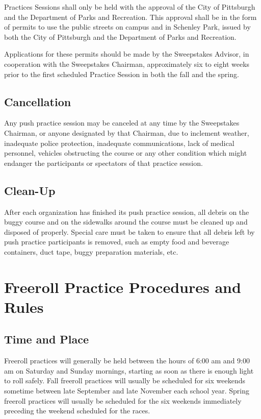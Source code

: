 	Practices Sessions shall only be held with the approval of the City of
	Pittsburgh and the Department of Parks and Recreation. This approval shall be
	in the form of permits to use the public streets on campus and in Schenley
	Park, issued by
	both the City of Pittsburgh and the Department of Parks and Recreation.

	Applications for these permits should be made by the Sweepstakes Advisor, in
	cooperation with the Sweepstakes Chairman, approximately six to eight weeks
	prior to the first scheduled Practice Session in both the fall and the spring.

\subsection{Cancellation}

	Any push practice session may be canceled at any time by the Sweepstakes
	Chairman, or anyone designated by that Chairman, due to inclement weather,
	inadequate police protection, inadequate communications, lack of medical
	personnel, vehicles obstructing the course or any other condition which might
	endanger the participants or spectators of that practice session.

\subsection{Clean-Up}

	After each organization has finished its push practice session, all debris on
	the buggy course and on the sidewalks around the course must be cleaned up and
	disposed of properly. Special care must be taken to ensure that all debris left
	by push practice participants is removed, such as empty food and beverage
	containers, duct tape, buggy preparation materials, etc.

\section{Freeroll Practice Procedures and Rules}

\subsection{Time and Place}

	Freeroll practices will generally be held between the hours of 6:00 am and
	9:00 am on Saturday and Sunday mornings, starting as soon as there is enough
	light to roll safely.  Fall freeroll practices will usually be scheduled for
	six weekends sometime between late September and late November each school
	year. Spring freeroll practices will usually be scheduled for the six weekends
	immediately preceding the weekend scheduled for the races.

